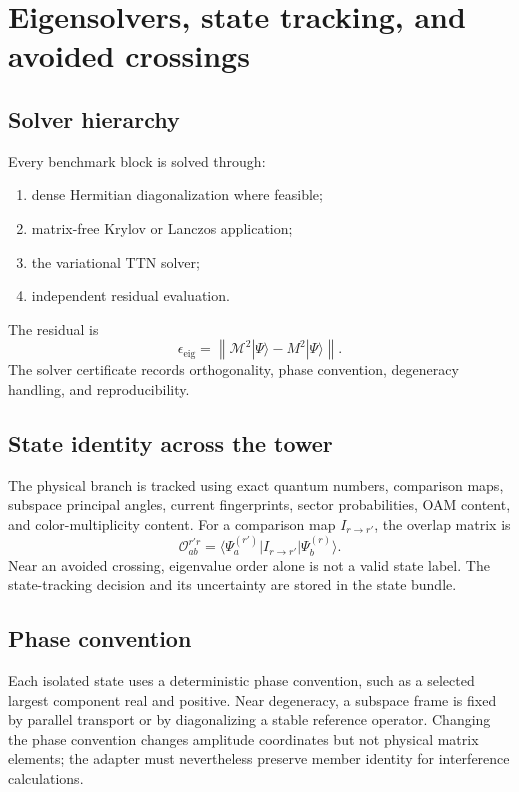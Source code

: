 \documentclass[11pt]{article}
\newcommand{\cO}{\mathcal O}
\newcommand{\cM}{\mathcal M}
\newcommand{\norm}[1]{\left\lVert#1\right\rVert}
\begin{document}
\section{Eigensolvers, state tracking, and avoided crossings}

\subsection{Solver hierarchy}

Every benchmark block is solved through:
\begin{enumerate}
 \item dense Hermitian diagonalization where feasible;
 \item matrix-free Krylov or Lanczos application;
 \item the variational TTN solver;
 \item independent residual evaluation.
\end{enumerate}
The residual is
\begin{equation}
 \epsilon_{\mathrm{eig}}
 =
 \norm{\cM^2|\Psi\rangle-M^2|\Psi\rangle}.
\end{equation}
The solver certificate records orthogonality, phase convention, degeneracy
handling, and reproducibility.

\subsection{State identity across the tower}

The physical branch is tracked using exact quantum numbers, comparison maps,
subspace principal angles, current fingerprints, sector probabilities, OAM
content, and color-multiplicity content.  For a comparison map
\(I_{r\to r'}\), the overlap matrix is
\begin{equation}
 \cO_{ab}^{r'r}
 =
 \langle\Psi_a^{(r')}|
 I_{r\to r'}|\Psi_b^{(r)}\rangle.
\end{equation}
Near an avoided crossing, eigenvalue order alone is not a valid state label.
The state-tracking decision and its uncertainty are stored in the state bundle.

\subsection{Phase convention}

Each isolated state uses a deterministic phase convention, such as a selected
largest component real and positive.  Near degeneracy, a subspace frame is
fixed by parallel transport or by diagonalizing a stable reference operator.
Changing the phase convention changes amplitude coordinates but not physical
matrix elements; the adapter must nevertheless preserve member identity for
interference calculations.
\end{document}

